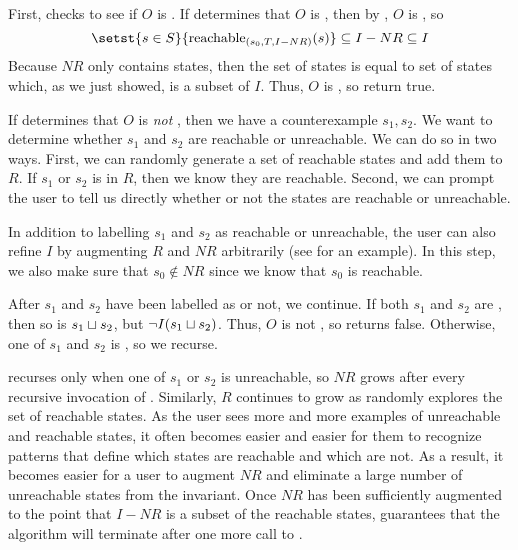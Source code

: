 First, \Helper{} checks to see if $O$ is .
%
If \IsIclosed{} determines that $O$ is , then by
, $O$ is , so
\[
  \setst{s \in S}{\stireachablepredicate{s_0}{T}{I-NR}{s}}
    \subseteq I - NR
    \subseteq I
\]
Because $NR$ only contains \sTIunreachable{} states, then the set of
\sTIreachable{} states is equal to set of  states
which, as we just showed, is a subset of $I$.  Thus, $O$ is \sTIconfluent{}, so
\Helper{} return true.

If \IsIclosed{} determines that $O$ is \emph{not} , then we
have a counterexample $s_1, s_2$. We want to determine whether $s_1$ and $s_2$
are reachable or unreachable. We can do so in two ways.
%
First, we can randomly generate a set of reachable states and add them to $R$.
If $s_1$ or $s_2$ is in $R$, then we know they are reachable.
%
Second, we can prompt the user to tell us directly whether or not the states
are reachable or unreachable.

In addition to labelling $s_1$ and $s_2$ as reachable or unreachable, the user
can also refine $I$ by augmenting $R$ and $NR$ arbitrarily (see
 for an example). In this step, we also make
sure that $s_0 \notin NR$ since we know that $s_0$ is reachable.

After $s_1$ and $s_2$ have been labelled as \sTIreachable{} or not, we
continue. If both $s_1$ and $s_2$ are \sTIreachable{}, then so is $s_1 \sqcup
s_2$, but $\lnot I(s_1 \sqcup s_2)$. Thus, $O$ is not \sTIconfluent{}, so
\Helper{} returns false. Otherwise, one of $s_1$ and $s_2$ is
\sTIunreachable{}, so we recurse.

\Helper{} recurses only when one of $s_1$ or $s_2$ is unreachable, so $NR$
grows after every recursive invocation of \Helper{}. Similarly, $R$ continues
to grow as \Helper{} randomly explores the set of reachable states. As the user
sees more and more examples of unreachable and reachable states, it often becomes
easier and easier for them to recognize patterns that define which states are
reachable and which are not. As a result, it becomes easier for a user to
augment $NR$ and eliminate a large number of unreachable states from the
invariant. Once $NR$ has been sufficiently augmented to the point that $I - NR$
is a subset of the reachable states, 
guarantees that the algorithm will terminate after one more call to \IsIclosed.

